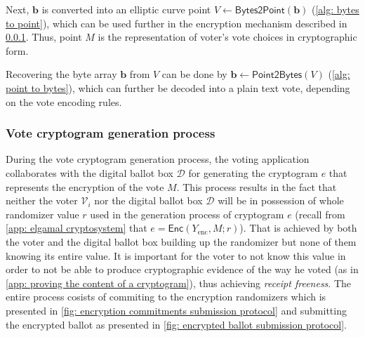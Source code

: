 Next, $\boldsymbol{b}$ is converted into an elliptic curve point $V \gets \mathsf{Bytes2Point}(\boldsymbol{b})$ (\cref{alg: bytes to point}), which can be used further in the encryption mechanism described in \cref{sec: vote cryptogram generation process}. Thus, point $M$ is the representation of voter's vote choices in cryptographic form.

Recovering the byte array $\boldsymbol{b}$ from $V$ can be done by $\boldsymbol{b} \gets \mathsf{Point2Bytes}(V)$ (\cref{alg: point to bytes}), which can further be decoded into a plain text vote, depending on the vote encoding rules.


\subsubsection{Vote cryptogram generation process} \label{sec: vote cryptogram generation process}
During the vote cryptogram generation process, the voting application collaborates with the digital ballot box $\mathcal{D}$ for generating the cryptogram $e$ that represents the encryption of the vote $M$. This process results in the fact that neither the voter $\mathcal{V}_i$ nor the digital ballot box $\mathcal{D}$ will be in possession of whole randomizer value $r$ used in the generation process of cryptogram $e$ (recall from \cref{app: elgamal cryptosystem} that $e = \mathsf{Enc}(Y_\mathrm{enc}, M; r)$). That is achieved by both the voter and the digital ballot box building up the randomizer but none of them knowing its entire value. It is important for the voter to not know this value in order to not be able to produce cryptographic evidence of the way he voted (as in \cref{app: proving the content of a cryptogram}), thus achieving \textit{receipt freeness}. The entire process cosists of commiting to the encryption randomizers which is presented in \cref{fig: encryption commitments submission protocol} and submitting the encrypted ballot as presented in \cref{fig: encrypted ballot submission protocol}.

